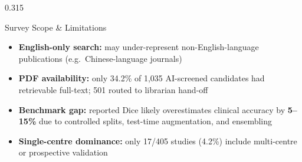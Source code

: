 \documentclass[final,t]{beamer}
\begin{document}
\begin{frame}[t]
\begin{columns}[t,totalwidth=\textwidth]
\begin{column}{0.315\textwidth}
\begin{pblock}{Survey Scope \& Limitations}
\small
\begin{itemize}\setlength\itemsep{1pt}
  \item \textbf{English-only search:} may under-represent
        non-English-language publications (e.g.\ Chinese-language journals)
  \item \textbf{PDF availability:} only 34.2\% of 1{,}035 AI-screened
        candidates had retrievable full-text; 501 routed to librarian hand-off
  \item \textbf{Benchmark gap:} reported Dice likely overestimates
        clinical accuracy by \textbf{5--15\%} due to controlled splits,
        test-time augmentation, and ensembling
  \item \textbf{Single-centre dominance:} only 17/405 studies (4.2\%)
        include multi-centre or prospective validation
\end{itemize}
\end{pblock}


\end{column}
\end{columns}
\end{frame}
\end{document}
